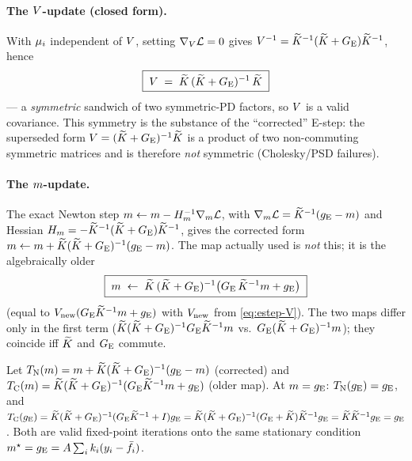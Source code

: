\paragraph{The $V$-update (closed form).}
With $\mu_i$ independent of $V$, setting $\nabla_{V}\mathcal{L}=0$ gives
$V^{-1}=\widetilde{K}^{-1}(\widetilde{K}+G_{\mathrm{E}})\widetilde{K}^{-1}$, hence
\begin{equation}
\boxed{\;V \;=\; \widetilde{K}\,(\widetilde{K}+G_{\mathrm{E}})^{-1}\,\widetilde{K}\;}
\label{eq:estep-V}
\end{equation}
--- a \emph{symmetric} sandwich of two symmetric-PD factors, so $V$ is a valid
covariance. This symmetry is the substance of the ``corrected'' E-step: the
superseded form $V=(\widetilde{K}+G_{\mathrm{E}})^{-1}\widetilde{K}$ is a product of two non-commuting
symmetric matrices and is therefore \emph{not} symmetric (Cholesky/PSD failures).

\paragraph{The $m$-update.}
The exact Newton step $m\leftarrow m-H_{m}^{-1}\nabla_{m}\mathcal{L}$, with
$\nabla_{m}\mathcal{L}=\widetilde{K}^{-1}(g_{\mathrm{E}}-m)$ and Hessian
$H_{m}=-\widetilde{K}^{-1}(\widetilde{K}+G_{\mathrm{E}})\widetilde{K}^{-1}$, gives the corrected form
$m\leftarrow m+\widetilde{K}(\widetilde{K}+G_{\mathrm{E}})^{-1}(g_{\mathrm{E}}-m)$. The map actually used is
\emph{not} this; it is the algebraically older
\begin{equation}
\boxed{\;m \;\leftarrow\; \widetilde{K}\,(\widetilde{K}+G_{\mathrm{E}})^{-1}\big(G_{\mathrm{E}}\,\widetilde{K}^{-1}m+g_{\mathrm{E}}\big)\;}
\label{eq:estep-m}
\end{equation}
(equal to $V_{\mathrm{new}}(G_{\mathrm{E}}\widetilde{K}^{-1}m+g_{\mathrm{E}})$ with $V_{\mathrm{new}}$ from
\eqref{eq:estep-V}). The two maps differ only in the first term
($\widetilde{K}(\widetilde{K}+G_{\mathrm{E}})^{-1}G_{\mathrm{E}}\widetilde{K}^{-1}m$ vs.\ $G_{\mathrm{E}}(\widetilde{K}+G_{\mathrm{E}})^{-1}m$); they
coincide iff $\widetilde{K}$ and $G_{\mathrm{E}}$ commute.


\begin{remark}
Let $T_{\mathrm N}(m)=m+\widetilde{K}(\widetilde{K}+G_{\mathrm{E}})^{-1}(g_{\mathrm{E}}-m)$ (corrected) and
$T_{\mathrm C}(m)=\widetilde{K}(\widetilde{K}+G_{\mathrm{E}})^{-1}(G_{\mathrm{E}}\widetilde{K}^{-1}m+g_{\mathrm{E}})$ (older map). At
$m=g_{\mathrm{E}}$:
$T_{\mathrm N}(g_{\mathrm{E}})=g_{\mathrm{E}}$, and
$T_{\mathrm C}(g_{\mathrm{E}})=\widetilde{K}(\widetilde{K}+G_{\mathrm{E}})^{-1}(G_{\mathrm{E}}\widetilde{K}^{-1}+I)g_{\mathrm{E}}
   =\widetilde{K}(\widetilde{K}+G_{\mathrm{E}})^{-1}(G_{\mathrm{E}}+\widetilde{K})\widetilde{K}^{-1}g_{\mathrm{E}}=\widetilde{K}\widetilde{K}^{-1}g_{\mathrm{E}}=g_{\mathrm{E}}$.
Both are valid fixed-point iterations onto the same stationary condition
$m^\star=g_{\mathrm{E}}=A\sum_ik_i(y_i-\bar{f}_i)$.
\end{remark}

